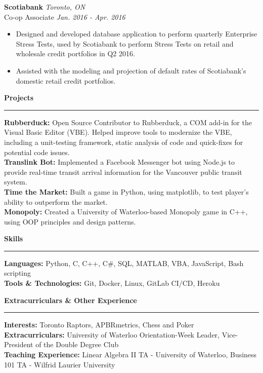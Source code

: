 \documentclass{letter}
\begin{document}
\begin{flushleft}
		{\large\textbf{Scotiabank}}  \hfill \textit{Toronto, ON} \\
		\vspace{1pt}
		Co-op Associate \hfill \textit{Jan. 2016 - Apr. 2016}
		\vspace{-9pt}
		\begin{itemize}
			\item Designed and developed database application to perform quarterly Enterprise Stress Tests, used by Scotiabank to perform Stress Tests on retail and wholesale credit portfolios in Q2 2016.\vspace{-3pt}
			\item Assisted with the modeling and projection of default rates of Scotiabank's domestic retail credit portfolios. 
		\end{itemize}
	\end{flushleft}

	\begin{flushleft}
		{\Large \textbf{Projects}}
		\rule[5pt]{\textwidth}{0.4pt}
		\textbf{Rubberduck:} Open Source Contributor to Rubberduck, a COM add-in for the Visual Basic Editor (VBE). Helped improve tools to modernize the VBE, including a unit-testing framework, static analysis of code and quick-fixes for potential code issues.\\
		\textbf{Translink Bot:} Implemented a Facebook Messenger bot using Node.js to provide real-time transit arrival information for the Vancouver public transit system.\\
		\textbf{Time the Market:} Built a game in Python, using matplotlib, to test player's ability to outperform the market.\\
		\textbf{Monopoly:} Created a University of Waterloo-based Monopoly game in C++, using OOP principles and design patterns.
	\end{flushleft}
	
	\begin{flushleft}
		{\Large \textbf{Skills}}
		\rule[5pt]{\textwidth}{0.4pt}
		\textbf{Languages:} Python, C, C++, C\#, SQL, MATLAB, VBA, JavaScript, Bash scripting\\
		\textbf{Tools \& Technologies:} Git, Docker, Linux, GitLab CI/CD, Heroku
	\end{flushleft}

	\begin{flushleft}
		{\Large \textbf{Extracurriculars \& Other Experience}}
		\rule[5pt]{\textwidth}{0.4pt}
		\textbf{Interests:} Toronto Raptors, APBRmetrics, Chess and Poker\\
		\textbf{Extracurriculars:} University of Waterloo Orientation-Week Leader, Vice-President of the Double Degree Club\\
		\textbf{Teaching Experience:} Linear Algebra II TA - University of Waterloo, Business 101 TA - Wilfrid Laurier University
	\end{flushleft}
\end{document}

